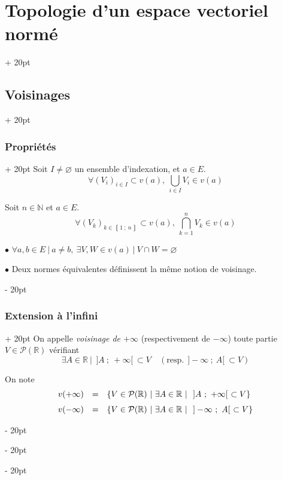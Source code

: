 \documentclass[a4paper, 12pt, twoside]{article}
\newcommand{\N}{\mathbb{N}} %
\newcommand{\R}{\mathbb{R}} %
\newcommand{\nset}[2]{\left\llbracket #1\ ;\ #2 \right\rrbracket}
\newcommand{\lr}[1]{\left( #1 \right)}
\newcommand{\set}[1]{\left\{ #1 \right\}}
\newcommand{\ind}[1][20pt]{\advance\leftskip + #1}
\newcommand{\deind}[1][20pt]{\advance\leftskip - #1}
\newenvironment{indt}[2][20pt]{#2 \par \ind[#1]}{\par \deind} %
\begin{document}
\begin{indt}{\section{Topologie d'un espace vectoriel normé}}
\begin{indt}{\subsection{Voisinages}}
\begin{indt}{\subsubsection{Propriétés}}
                Soit $I \neq \varnothing$ un ensemble d'indexation, et $a \in E$.
                \[
                    \forall \lr{V_i}_{i \in I} \subset v(a),\
                    \bigcup_{i \in I} V_i \in v(a)
                \]

                Soit $n \in \N$ et $a \in E$.
                \[
                    \forall \!\lr{V_k}_{k \in \nset 1 n} \subset v(a),\
                    \bigcap_{k = 1}^n V_k \in v(a)
                \]

                $\bullet$ $
                    \forall a, b \in E\ |\ a \neq b,\
                    \exists V, W \in v(a)\ |\ V \cap W = \varnothing
                $

                $\bullet$ Deux normes équivalentes définissent la même notion de voisinage.
            \end{indt}

            \vspace{12pt}
            
            \begin{indt}{\subsubsection{Extension à l'infini}}
                On appelle \emph{voisinage de $+\infty$} (respectivement de $-\infty$) toute partie $V \in \mathcal P(\R)$ vérifiant
                \[
                    \exists A \in \R\ |\ \ ]A\ ;\ +\infty[\ \subset V
                    \quad (\text{resp.}\ \ ] -\!\infty\ ;\ A[\ \subset V)
                \]

                On note
                \[
                    \begin{array}{rcl}
                        v(+\infty)
                        &=&
                        \set{V \in \mathcal P(\R)\ |\ \exists A \in \R\ |\ \ ]A\ ;\ +\infty[\ \subset V}
                        \vspace{6pt}
                        \\
                        v(-\infty)
                        &=&
                        \set{V \in \mathcal P(\R)\ |\ \exists A \in \R\ |\ \ ] -\!\infty\ ;\ A[\ \subset V}
                    \end{array}
                \]
            \end{indt}
        \end{indt}

        \vspace{12pt}
        

\end{indt}
\end{document}
